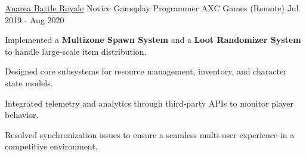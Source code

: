 \begin{cventries}
  \cventry
    {\href{https://wizardcell.com/about/anarea}{\underline{Anarea Battle Royale}}}
    {Novice Gameplay Programmer}
    {AXC Games (Remote)}
    {Jul 2019 - Aug 2020}
    {
      \begin{cvitems}
        \item {Implemented a \textbf{Multizone Spawn System} and a \textbf{Loot Randomizer System} to handle large-scale item distribution.}
        \item {Designed core subsystems for resource management, inventory, and character state models.}
        \item {Integrated telemetry and analytics through third-party APIs to monitor player behavior.}
        \item {Resolved synchronization issues to ensure a seamless multi-user experience in a competitive environment.}
      \end{cvitems}
    }

\end{cventries}
